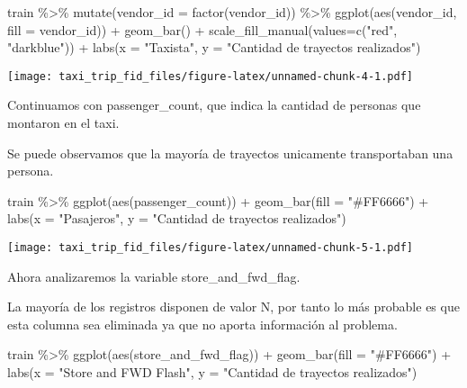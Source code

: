 \documentclass[
]{article}
\newenvironment{Shaded}{\begin{snugshade}}{\end{snugshade}}
\newcommand{\AttributeTok}[1]{\textcolor[rgb]{0.77,0.63,0.00}{#1}}
\newcommand{\FunctionTok}[1]{\textcolor[rgb]{0.00,0.00,0.00}{#1}}
\newcommand{\NormalTok}[1]{#1}
\newcommand{\SpecialCharTok}[1]{\textcolor[rgb]{0.00,0.00,0.00}{#1}}
\newcommand{\StringTok}[1]{\textcolor[rgb]{0.31,0.60,0.02}{#1}}
\begin{document}
\begin{Shaded}
\begin{Highlighting}[]
\NormalTok{train }\SpecialCharTok{\%\textgreater{}\%}
  \FunctionTok{mutate}\NormalTok{(}\AttributeTok{vendor\_id =} \FunctionTok{factor}\NormalTok{(vendor\_id)) }\SpecialCharTok{\%\textgreater{}\%}
  \FunctionTok{ggplot}\NormalTok{(}\FunctionTok{aes}\NormalTok{(vendor\_id, }\AttributeTok{fill =}\NormalTok{ vendor\_id)) }\SpecialCharTok{+}
  \FunctionTok{geom\_bar}\NormalTok{() }\SpecialCharTok{+}
  \FunctionTok{scale\_fill\_manual}\NormalTok{(}\AttributeTok{values=}\FunctionTok{c}\NormalTok{(}\StringTok{"red"}\NormalTok{, }\StringTok{"darkblue"}\NormalTok{)) }\SpecialCharTok{+}
  \FunctionTok{labs}\NormalTok{(}\AttributeTok{x =} \StringTok{"Taxista"}\NormalTok{, }\AttributeTok{y =} \StringTok{"Cantidad de trayectos realizados"}\NormalTok{)}
\end{Highlighting}
\end{Shaded}

\texttt{[image: taxi\_trip\_fid\_files/figure-latex/unnamed-chunk-4-1.pdf]}

Continuamos con passenger\_count, que indica la cantidad de personas que
montaron en el taxi.

Se puede observamos que la mayoría de trayectos unicamente transportaban
una persona.

\begin{Shaded}
\begin{Highlighting}[]
\NormalTok{train }\SpecialCharTok{\%\textgreater{}\%}
  \FunctionTok{ggplot}\NormalTok{(}\FunctionTok{aes}\NormalTok{(passenger\_count)) }\SpecialCharTok{+}
  \FunctionTok{geom\_bar}\NormalTok{(}\AttributeTok{fill =} \StringTok{"\#FF6666"}\NormalTok{) }\SpecialCharTok{+}
  \FunctionTok{labs}\NormalTok{(}\AttributeTok{x =} \StringTok{"Pasajeros"}\NormalTok{, }\AttributeTok{y =} \StringTok{"Cantidad de trayectos realizados"}\NormalTok{)}
\end{Highlighting}
\end{Shaded}

\texttt{[image: taxi\_trip\_fid\_files/figure-latex/unnamed-chunk-5-1.pdf]}

Ahora analizaremos la variable store\_and\_fwd\_flag.

La mayoría de los registros disponen de valor N, por tanto lo más
probable es que esta columna sea eliminada ya que no aporta información
al problema.

\begin{Shaded}
\begin{Highlighting}[]
\NormalTok{train }\SpecialCharTok{\%\textgreater{}\%} 
    \FunctionTok{ggplot}\NormalTok{(}\FunctionTok{aes}\NormalTok{(store\_and\_fwd\_flag)) }\SpecialCharTok{+}
    \FunctionTok{geom\_bar}\NormalTok{(}\AttributeTok{fill =} \StringTok{"\#FF6666"}\NormalTok{) }\SpecialCharTok{+}
    \FunctionTok{labs}\NormalTok{(}\AttributeTok{x =} \StringTok{"Store and FWD Flash"}\NormalTok{, }\AttributeTok{y =} \StringTok{"Cantidad de trayectos realizados"}\NormalTok{)}
\end{Highlighting}
\end{Shaded}
\end{document}
